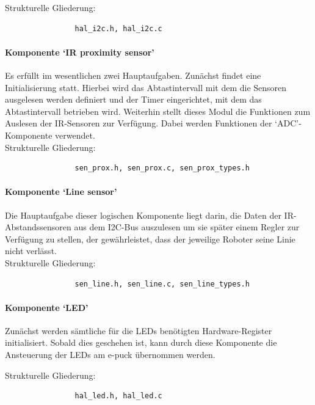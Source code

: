\documentclass[10pt,a4paper]{article}
\begin{document}
			Strukturelle Gliederung:
				\begin{verbatim}  
				hal_i2c.h, hal_i2c.c
				\end{verbatim}
			
			\paragraph*{Komponente `IR proximity sensor'}
			Es erfüllt im wesentlichen zwei Hauptaufgaben.
			Zunächst findet eine Initialisierung statt. Hierbei wird das Abtastintervall mit dem die Sensoren ausgelesen werden definiert und der 
			Timer eingerichtet, mit dem das Abtastintervall betrieben wird.
			Weiterhin stellt dieses Modul die Funktionen zum Auslesen der IR-Sensoren zur Verfügung. Dabei werden Funktionen der `ADC'-Komponente 		
			verwendet. \\
			
			Strukturelle Gliederung:
				\begin{verbatim}  
				sen_prox.h, sen_prox.c, sen_prox_types.h
				\end{verbatim}
			
			\paragraph*{Komponente `Line sensor'}
			Die Hauptaufgabe dieser logischen Komponente liegt darin, die Daten der IR-Abstandssensoren aus dem I2C-Bus auszulesen um sie später 
			einem Regler zur Verfügung zu stellen, der gewährleistet, dass der jeweilige Roboter seine Linie nicht verlässt. \\
			
			Strukturelle Gliederung:
				\begin{verbatim}  
				sen_line.h, sen_line.c, sen_line_types.h
				\end{verbatim}
			
			\paragraph*{Komponente `LED'}
			Zunächst werden sämtliche für die LEDs benötigten Hardware-Register initialisiert. Sobald dies geschehen ist, kann durch diese Komponente
			die Ansteuerung der LEDs am e-puck übernommen werden.
			
			Strukturelle Gliederung:
				\begin{verbatim}  
				hal_led.h, hal_led.c
				\end{verbatim}
\end{document}
